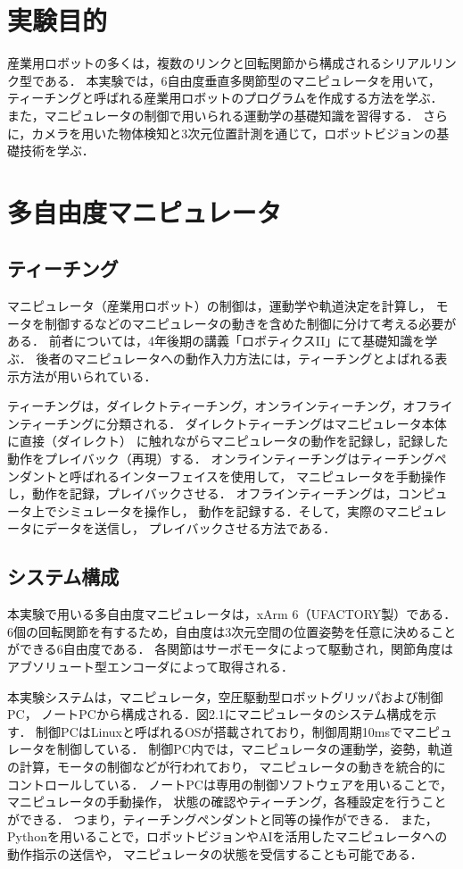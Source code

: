 
\section{実験目的}

産業用ロボットの多くは，複数のリンクと回転関節から構成されるシリアルリンク型である．
本実験では，6自由度垂直多関節型のマニピュレータを用いて，
ティーチングと呼ばれる産業用ロボットのプログラムを作成する方法を学ぶ．
また，マニピュレータの制御で用いられる運動学の基礎知識を習得する．
さらに，カメラを用いた物体検知と3次元位置計測を通じて，ロボットビジョンの基礎技術を学ぶ．


\section{多自由度マニピュレータ}

\subsection{ティーチング}
マニピュレータ（産業用ロボット）の制御は，運動学や軌道決定を計算し，
モータを制御するなどのマニピュレータの動きを含めた制御に分けて考える必要がある．
前者については，4年後期の講義「ロボティクスII」にて基礎知識を学ぶ．
後者のマニピュレータへの動作入力方法には，ティーチングとよばれる表示方法が用いられている．

ティーチングは，ダイレクトティーチング，オンラインティーチング，オフラインティーチングに分類される．
ダイレクトティーチングはマニピュレータ本体に直接（ダイレクト）
に触れながらマニピュレータの動作を記録し，記録した動作をプレイバック（再現）する．
オンラインティーチングはティーチングペンダントと呼ばれるインターフェイスを使用して，
マニピュレータを手動操作し，動作を記録，プレイバックさせる．
オフラインティーチングは，コンピュータ上でシミュレータを操作し，
動作を記録する．そして，実際のマニピュレータにデータを送信し，
プレイバックさせる方法である．

\subsection{システム構成}
本実験で用いる多自由度マニピュレータは，xArm 6（UFACTORY製）である．
6個の回転関節を有するため，自由度は3次元空間の位置姿勢を任意に決めることができる6自由度である．
各関節はサーボモータによって駆動され，関節角度はアブソリュート型エンコーダによって取得される．

本実験システムは，マニピュレータ，空圧駆動型ロボットグリッパおよび制御PC，
ノートPCから構成される．図2.1にマニピュレータのシステム構成を示す．
制御PCはLinuxと呼ばれるOSが搭載されており，制御周期10msでマニピュレータを制御している．
制御PC内では，マニピュレータの運動学，姿勢，軌道の計算，モータの制御などが行われており，
マニピュレータの動きを統合的にコントロールしている．
ノートPCは専用の制御ソフトウェアを用いることで，マニピュレータの手動操作，
状態の確認やティーチング，各種設定を行うことができる．
つまり，ティーチングペンダントと同等の操作ができる．
また，Pythonを用いることで，ロボットビジョンやAIを活用したマニピュレータへの動作指示の送信や，
マニピュレータの状態を受信することも可能である．

